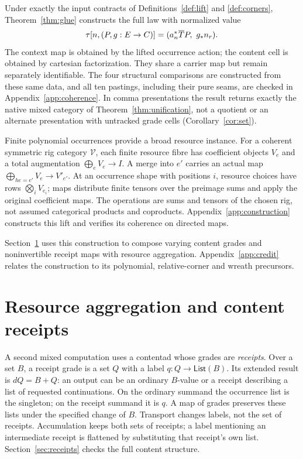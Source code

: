 \documentclass[11pt]{article}
\numberwithin{equation}{section}
\theoremstyle{definition}\newtheorem{definition}[theorem]{Definition}
\newcommand{\V}{\mathcal V}\newcommand{\Set}{\mathsf{Set}}\newcommand{\Cat}{\mathsf{Cat}}
\begin{document}
Under exactly the input contracts of Definitions~\ref{def:lift} and
\ref{def:corners}, Theorem~\ref{thm:glue} constructs the full law with
normalized value
\[
             \tau[n,(P,g:E\to C)]=(a_n^*\overline T P,\ g_*n_r).
\]
The context map is obtained by the lifted occurrence action; the content
cell is obtained by cartesian factorization. They share a carrier map but
remain separately identifiable. The four structural comparisons are
constructed from these same data, and all ten pastings, including their
pure seams, are checked in Appendix~\ref{app:coherence}. In comma
presentations the result returns exactly the native mixed category of
Theorem~\ref{thm:unification}, not a quotient or an alternate presentation
with untracked grade cells (Corollary~\ref{cor:set}).

Finite polynomial occurrences provide a broad resource instance. For a
coherent symmetric rig category $\V$, each finite resource fibre has
coefficient objects $V_e$ and a total augmentation
$\bigoplus_eV_e\to I$. A merge into $e'$ carries an actual map
$\bigoplus_{he=e'}V_e\to V'_{e'}$. At an occurrence shape with positions
$i$, resource choices have rows $\bigotimes_iV_{e_i}$; maps distribute
finite tensors over the preimage sums and apply the original coefficient
maps. The operations are sums and tensors of the chosen rig, not assumed
categorical products and coproducts. Appendix~\ref{app:construction}
constructs this lift and verifies its coherence on directed maps.

Section~\ref{sec:paired} uses this construction to compose varying content
grades and noninvertible receipt maps with resource aggregation.
Appendix~\ref{app:credit} relates the construction to its polynomial,
relative-corner and wreath precursors.

\section{Resource aggregation and content receipts}\label{sec:paired}
A second mixed computation uses a contentad whose grades are
\emph{receipts}. Over a set $B$, a receipt grade is a set $Q$ with a label
$q:Q\to\mathsf{List}(B)$. Its extended result is $dQ=B+Q$: an output
can be an ordinary $B$-value or a receipt describing a list of requested
continuations. On the ordinary summand the occurrence list is the singleton;
on the receipt summand it is $q$. A map of grades preserves these lists
under the specified change of $B$. Transport changes labels, not the set
of receipts. Accumulation keeps both sets of receipts; a label mentioning an
intermediate receipt is flattened by substituting that receipt's own list. Section~\ref{sec:receipts}
checks the full content structure.
\end{document}
